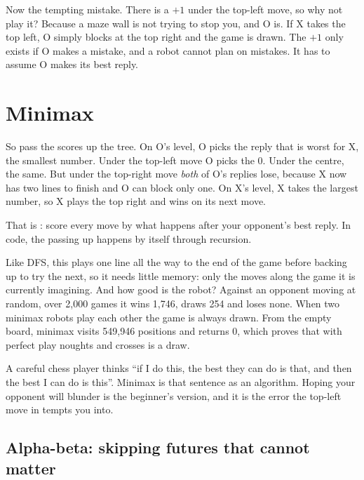 Now the tempting mistake. There is a $+1$ under the top-left move, so why not play it? Because a maze wall is not trying to stop you, and O is. If X takes the top left, O simply blocks at the top right and the game is drawn. The $+1$ only exists if O makes a mistake, and a robot cannot plan on mistakes. It has to assume O makes its best reply.

\section{Minimax}

So pass the scores up the tree. On O's level, O picks the reply that is worst for X, the smallest number. Under the top-left move O picks the 0. Under the centre, the same. But under the top-right move \emph{both} of O's replies lose, because X now has two lines to finish and O can block only one. On X's level, X takes the largest number, so X plays the top right and wins on its next move.

That is : score every move by what happens after your opponent's best reply. In code, the passing up happens by itself through recursion.



Like DFS, this plays one line all the way to the end of the game before backing up to try the next, so it needs little memory: only the moves along the game it is currently imagining. And how good is the robot? Against an opponent moving at random, over 2,000 games it wins 1,746, draws 254 and loses none. When two minimax robots play each other the game is always drawn. From the empty board, minimax visits 549,946 positions and returns 0, which proves that with perfect play noughts and crosses is a draw.

\begin{analogy}
A careful chess player thinks ``if I do this, the best they can do is that, and then the best I can do is this''. Minimax is that sentence as an algorithm. Hoping your opponent will blunder is the beginner's version, and it is the error the top-left move in  tempts you into.
\end{analogy}

\subsection{Alpha-beta: skipping futures that cannot matter}

